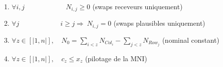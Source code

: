 \documentclass[11pt,a4paper]{report}
\begin{document}
\begin{enumerate}
    \item $ \forall i,j  \qquad \qquad \qquad  N_{i,j} \geq 0 $ \qquad \qquad \qquad  \qquad (swaps receveurs uniquement)
    \item $ \forall j   \qquad \qquad \qquad i \geq j  \Rightarrow \  N_{i,j} = 0 $ \quad \qquad  \qquad (swaps plausibles uniquement)
    \item $ \forall z \in [|1,n|], \quad N_0 = \sum\limits_{i < z} N_{Col_i} - \sum\limits_{j < z} N_{Row_j}  $ \quad (nominal constant)
    \item $ \forall z \in [|1,n|], \quad c_z \leq x_z  $  \qquad  \qquad  \qquad  \qquad  \qquad (pilotage de la MNI)
\end{enumerate}
\end{document}
